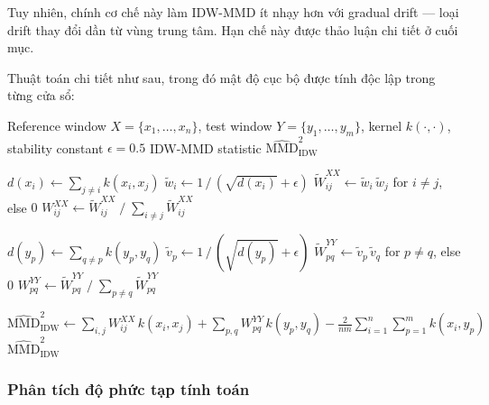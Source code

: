 Tuy nhiên, chính cơ chế này làm IDW-MMD ít nhạy hơn với gradual drift --- loại drift thay đổi dần từ vùng trung tâm. Hạn chế này được thảo luận chi tiết ở cuối mục.

Thuật toán chi tiết như sau, trong đó mật độ cục bộ được tính độc lập trong từng cửa sổ:

\begin{algorithm}[H]
	\caption[Inverse Density-Weighted MMD (IDW-MMD)]{Inverse Density-Weighted MMD (IDW-MMD).}
	\label{alg:idw_mmd}
	\begin{algorithmic}[1]
		\Require Reference window $X = \{x_1, \ldots, x_n\}$, test window $Y = \{y_1, \ldots, y_m\}$, kernel $k(\cdot,\cdot)$, stability constant $\epsilon = 0.5$
		\Ensure IDW-MMD statistic $\widehat{\text{MMD}}^2_{\text{IDW}}$
		
		 
			\State $d(x_i) \leftarrow \sum_{j \neq i} k(x_i, x_j)$ 
			\State $\tilde{w}_i \leftarrow 1 \,/\, (\sqrt{d(x_i)} + \epsilon)$
		\EndFor
		\State $\widetilde{W}^{XX}_{ij} \leftarrow \tilde{w}_i\, \tilde{w}_j$ for $i \neq j$, else $0$
		\State $W^{XX}_{ij} \leftarrow \widetilde{W}^{XX}_{ij} \;/\; {\textstyle\sum_{i \neq j} \widetilde{W}^{XX}_{ij}}$ 
		
		 
			\State $d(y_p) \leftarrow \sum_{q \neq p} k(y_p, y_q)$
			\State $\tilde{v}_p \leftarrow 1 \,/\, (\sqrt{d(y_p)} + \epsilon)$
		\EndFor
		\State $\widetilde{W}^{YY}_{pq} \leftarrow \tilde{v}_p\, \tilde{v}_q$ for $p \neq q$, else $0$
		\State $W^{YY}_{pq} \leftarrow \widetilde{W}^{YY}_{pq} \;/\; {\textstyle\sum_{p \neq q} \widetilde{W}^{YY}_{pq}}$
		
		\State $\widehat{\text{MMD}}^2_{\text{IDW}} \leftarrow
			{\displaystyle\sum_{i,j}} W^{XX}_{ij}\, k(x_i, x_j)
			+ {\displaystyle\sum_{p,q}} W^{YY}_{pq}\, k(y_p, y_q)
			- \frac{2}{nm} {\displaystyle\sum_{i=1}^{n}\sum_{p=1}^{m}} k(x_i, y_p)$
		\Return $\widehat{\text{MMD}}^2_{\text{IDW}}$
	\end{algorithmic}
\end{algorithm}

\subsubsection{Phân tích độ phức tạp tính toán}

